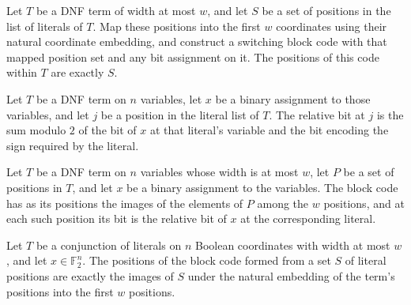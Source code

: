 \begin{theorem}
\label{FABL.SwitchingBlockCode.termPositions_of_mapped}
\leanok
{}
Let $T$ be a DNF term of width at most $w$, and let $S$ be a set of positions in the
list of literals of $T$. Map these positions into the first $w$ coordinates using their
natural coordinate embedding, and construct a switching block code with that mapped
position set and any bit assignment on it. The positions of this code within $T$ are
exactly $S$.
\end{theorem}

\begin{definition}
\label{FABL.DNFTerm.relativeBit}
\leanok
{}
Let $T$ be a DNF term on $n$ variables, let $x$ be a binary assignment to those
variables, and let $j$ be a position in the literal list of $T$. The relative bit at $j$
is the sum modulo $2$ of the bit of $x$ at that literal’s variable and the bit encoding
the sign required by the literal.
\end{definition}

\begin{definition}
\label{FABL.DNFTerm.blockCode}
\leanok
{}
Let $T$ be a DNF term on $n$ variables whose width is at most $w$, let $P$ be a set of
positions in $T$, and let $x$ be a binary assignment to the variables. The block code
has as its positions the images of the elements of $P$ among the $w$ positions, and at
each such position its bit is the relative bit of $x$ at the corresponding literal.
\end{definition}

\begin{theorem}
\label{FABL.DNFTerm.blockCode_positions}
\leanok
{}
Let $T$ be a conjunction of literals on $n$ Boolean coordinates with width at most $w$,
and let $x\in\mathbb{F}_2^n$. The positions of the block code formed from a set $S$ of
literal positions are exactly the images of $S$ under the natural embedding of the
term's positions into the first $w$ positions.
\end{theorem}

